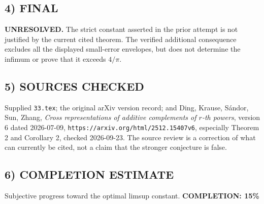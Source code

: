 \subsection*{4) FINAL}
\textbf{UNRESOLVED.} The strict constant asserted in the prior attempt is not justified by the current cited theorem. The verified additional consequence excludes all the displayed small-error envelopes, but does not determine the infimum or prove that it exceeds $4/\pi$.
\subsection*{5) SOURCES CHECKED}
Supplied \texttt{33.tex}; the original arXiv version record; and Ding, Krause, S\'andor, Sun, Zhang, \emph{Cross representations of additive complements of $r$-th powers}, version 6 dated 2026-07-09, \texttt{https://arxiv.org/html/2512.15407v6}, especially Theorem 2 and Corollary 2, checked 2026-09-23. The source review is a correction of what can currently be cited, not a claim that the stronger conjecture is false.
\subsection*{6) COMPLETION ESTIMATE}
Subjective progress toward the optimal limsup constant.
\textbf{COMPLETION: 15\%}
